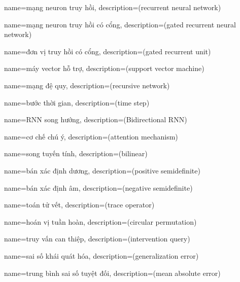 {
    name={mạng neuron truy hồi},
    description={(recurrent neural network)}
}


{
    name={mạng neuron truy hồi có cổng},
    description={(gated recurrent neural network)}
}

{
    name={đơn vị truy hồi có cổng},
    description={(gated recurrent unit)}
}


{
    name={máy vector hỗ trợ},
    description={(support vector machine)}
}


{
    name={mạng đệ quy},
    description={(recursive network)}
}

{
    name={bước thời gian},
    description={(time step)}
}

{
    name={RNN song hướng},
    description={(Bidirectional RNN)}
}

{
    name={cơ chế chú ý},
    description={(attention mechanism)}
}

{
    name={song tuyến tính},
    description={(bilinear)}
}

{
    name={bán xác định dương},
    description={(positive semidefinite)}
}

{
    name={bán xác định âm},
    description={(negative semidefinite)}
}

{
    name={toán tử vết},
    description={(trace operator)}
}

{
    name={hoán vị tuần hoàn},
    description={(circular permutation)}
}

{
    name={truy vấn can thiệp},
    description={(intervention query)}
}

{
    name={sai số khái quát hóa},
    description={(generalization error)}
}

{
    name={trung bình sai số tuyệt đối},
    description={(mean absolute error)}
}

